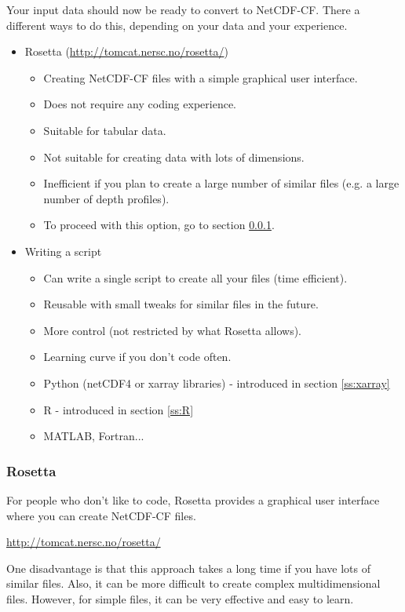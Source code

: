\documentclass[a4paper,english, 11pt]{article}
\begin{document}
Your input data should now be ready to convert to NetCDF-CF. There a different ways to do this, depending on your data and your experience.

\begin{itemize}
\item Rosetta (\href{http://tomcat.nersc.no/rosetta/}{http://tomcat.nersc.no/rosetta/})
\begin{itemize}
\item Creating NetCDF-CF files with a simple graphical user interface. 
\item Does not require any coding experience.
\item Suitable for tabular data.
\item Not suitable for creating data with lots of dimensions.
\item Inefficient if you plan to create a large number of similar files (e.g. a large number of depth profiles).
\item To proceed with this option, go to section \ref{ss:Rosetta}.
\end{itemize}
\item Writing a script
\begin{itemize}
\item Can write a single script to create all your files (time efficient). 
\item Reusable with small tweaks for similar files in the future.
\item More control (not restricted by what Rosetta allows).
\item Learning curve if you don't code often.
\item Python (netCDF4 or xarray libraries) - introduced in section \ref{ss:xarray}
\item R - introduced in section \ref{ss:R}
\item MATLAB, Fortran...   
\end{itemize}
\end{itemize}

\subsubsection{Rosetta}
\label{ss:Rosetta}

For people who don't like to code, Rosetta provides a graphical user interface where you can create NetCDF-CF files.

\href{http://tomcat.nersc.no/rosetta/}{http://tomcat.nersc.no/rosetta/}

One disadvantage is that this approach takes a long time if you have lots of similar files. Also, it can be more difficult to create complex multidimensional files. However, for simple files, it can be very effective and easy to learn.
\end{document}
